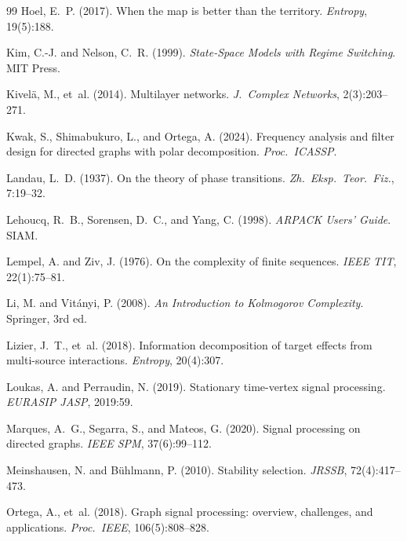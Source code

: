 \documentclass[11pt,a4paper]{article}
\theoremstyle{definition}
\begin{document}
\begin{thebibliography}{99}
Hoel, E.~P. (2017). When the map is better than the territory. \emph{Entropy}, 19(5):188.

Kim, C.-J. and Nelson, C.~R. (1999). \emph{State-Space Models with Regime Switching}. MIT Press.

Kivel\"{a}, M., et~al. (2014). Multilayer networks. \emph{J.\ Complex Networks}, 2(3):203--271.

Kwak, S., Shimabukuro, L., and Ortega, A. (2024). Frequency analysis and filter design for directed graphs with polar decomposition. \emph{Proc.\ ICASSP}.

Landau, L.~D. (1937). On the theory of phase transitions. \emph{Zh.\ Eksp.\ Teor.\ Fiz.}, 7:19--32.

Lehoucq, R.~B., Sorensen, D.~C., and Yang, C. (1998). \emph{ARPACK Users' Guide}. SIAM.

Lempel, A. and Ziv, J. (1976). On the complexity of finite sequences. \emph{IEEE TIT}, 22(1):75--81.

Li, M. and Vit\'{a}nyi, P. (2008). \emph{An Introduction to Kolmogorov Complexity}. Springer, 3rd ed.

Lizier, J.~T., et~al. (2018). Information decomposition of target effects from multi-source interactions. \emph{Entropy}, 20(4):307.

Loukas, A. and Perraudin, N. (2019). Stationary time-vertex signal processing. \emph{EURASIP JASP}, 2019:59.

Marques, A.~G., Segarra, S., and Mateos, G. (2020). Signal processing on directed graphs. \emph{IEEE SPM}, 37(6):99--112.

Meinshausen, N. and B\"{u}hlmann, P. (2010). Stability selection. \emph{JRSSB}, 72(4):417--473.

Ortega, A., et~al. (2018). Graph signal processing: overview, challenges, and applications. \emph{Proc.\ IEEE}, 106(5):808--828.


\end{thebibliography}
\end{document}
